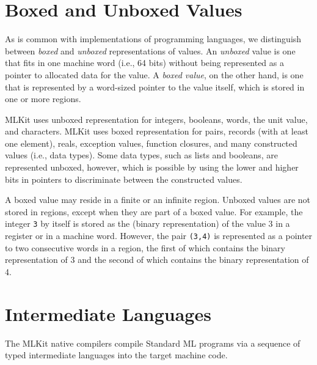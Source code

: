 \documentclass[12pt]{book}
\begin{document}
\section{Boxed and Unboxed Values}
\label{boxing.sec}
%
%
%

As is common with implementations of programming languages, we distinguish
between \emph{boxed} and \emph{unboxed} representations of values.  An
\emph{unboxed} value is one that fits in one machine word (i.e., 64 bits)
without being represented as a pointer to allocated data for the value. A
\emph{boxed value}, on the other hand, is one that is represented by a
word-sized pointer to the value itself, which is stored in one or more regions.

MLKit uses unboxed representation for integers, booleans, words, the unit
value, and characters.  MLKit uses boxed representation for pairs, records
(with at least one element), reals, exception values, function closures, and
many constructed values (i.e., data types). Some data types, such as lists and
booleans, are represented unboxed, however, which is possible by using the lower
and higher bits in pointers to discriminate between the constructed values.

A boxed value may reside in a finite or an infinite region.  Unboxed values are
not stored in regions, except when they are part of a boxed value. For example,
the integer \lstinline{3} by itself is stored as the (binary representation) of the
value 3 in a register or in a machine word. However, the pair \lstinline{(3,4)} is
represented as a pointer to two consecutive words in a region, the first of
which contains the binary representation of 3 and the second of which contains
the binary representation of 4.

\section{Intermediate Languages}
The MLKit native compilers compile Standard ML programs via a sequence
of typed intermediate languages into the target machine code.
\end{document}
